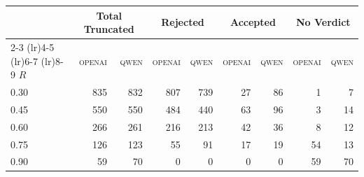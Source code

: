 \begin{tabular}{lrrrrrrrr}
\toprule
  & \multicolumn{2}{c}{Total Truncated} & \multicolumn{2}{c}{Rejected} & \multicolumn{2}{c}{Accepted} & \multicolumn{2}{c}{No Verdict} \\
  \cmidrule(lr){2-3} \cmidrule(lr){4-5} \cmidrule(lr){6-7} \cmidrule(lr){8-9}
$R$ & \textsc{openai} & \textsc{qwen} & \textsc{openai} & \textsc{qwen} & \textsc{openai} & \textsc{qwen} & \textsc{openai} & \textsc{qwen} \\
\midrule
0.30 & 835 & 832 & 807 & 739 & 27 & 86 & 1 & 7 \\
0.45 & 550 & 550 & 484 & 440 & 63 & 96 & 3 & 14 \\
0.60 & 266 & 261 & 216 & 213 & 42 & 36 & 8 & 12 \\
0.75 & 126 & 123 & 55 & 91 & 17 & 19 & 54 & 13 \\
0.90 & 59 & 70 & 0 & 0 & 0 & 0 & 59 & 70 \\
\bottomrule
\end{tabular}

